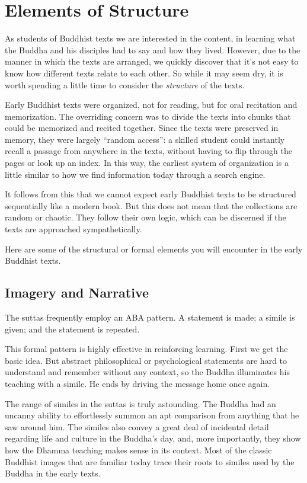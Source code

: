 \documentclass[12pt,openany]{book}%
\begin{document}
\section*{Elements of Structure}

As students of Buddhist texts we are interested in the content, in learning what the Buddha and his disciples had to say and how they lived. However, due to the manner in which the texts are arranged, we quickly discover that it’s not easy to know how different texts relate to each other. So while it may seem dry, it is worth spending a little time to consider the \emph{structure} of the texts.

Early Buddhist texts were organized, not for reading, but for oral recitation and memorization. The overriding concern was to divide the texts into chunks that could be memorized and recited together. Since the texts were preserved in memory, they were largely “random access”: a skilled student could instantly recall a passage from anywhere in the texts, without having to flip through the pages or look up an index. In this way, the earliest system of organization is a little similar to how we find information today through a search engine.

It follows from this that we cannot expect early Buddhist texts to be structured sequentially like a modern book. But this does not mean that the collections are random or chaotic. They follow their own logic, which can be discerned if the texts are approached sympathetically.

Here are some of the structural or formal elements you will encounter in the early Buddhist texts.

\subsection*{Imagery and Narrative}

The suttas frequently employ an ABA pattern. A statement is made; a simile is given; and the statement is repeated.

This formal pattern is highly effective in reinforcing learning. First we get the basic idea. But abstract philosophical or psychological statements are hard to understand and remember without any context, so the Buddha illuminates his teaching with a simile. He ends by driving the message home once again.

The range of similes in the suttas is truly astounding. The Buddha had an uncanny ability to effortlessly summon an apt comparison from anything that he saw around him. The similes also convey a great deal of incidental detail regarding life and culture in the Buddha’s day, and, more importantly, they show how the Dhamma teaching makes sense in its context. Most of the classic Buddhist images that are familiar today trace their roots to similes used by the Buddha in the early texts.
\end{document}
